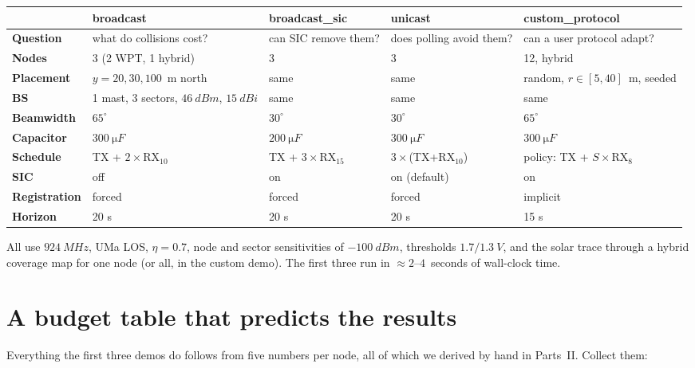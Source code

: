 \begin{center}
\footnotesize
\renewcommand{\arraystretch}{1.15}
\begin{tabularx}{\linewidth}{@{}>{\sffamily\bfseries}p{2.3cm}XXXX@{}}
\toprule
 & broadcast & broadcast\_sic & unicast & custom\_protocol\\
\midrule
Question & what do collisions cost? & can SIC remove them? & does polling avoid them? & can a user protocol adapt?\\
Nodes & 3 (2 WPT, 1 hybrid) & 3 & 3 & 12, hybrid\\
Placement & $y=20,30,100$~m north & same & same & random, $r\in[5,40]$~m, seeded\\
BS & 1 mast, 3 sectors, $\SI{46}{dBm}$, $\SI{15}{dBi}$ & same & same & same\\
Beamwidth & $65^\circ$ & $30^\circ$ & $30^\circ$ & $65^\circ$\\
Capacitor & $\SI{300}{\micro F}$ & $\SI{200}{\micro F}$ & $\SI{300}{\micro F}$ & $\SI{300}{\micro F}$\\
Schedule & TX + $2\times$RX$_{10}$ & TX + $3\times$RX$_{15}$ & $3\times$(TX+RX$_{10}$) & policy: TX + $S\times$RX$_8$\\
SIC & off & on & on (default) & on\\
Registration & forced & forced & forced & implicit\\
Horizon & 20 s & 20 s & 20 s & 15 s\\
\bottomrule
\end{tabularx}
\end{center}
All use $\SI{924}{MHz}$, UMa LOS, $\eta=0.7$, node and sector sensitivities of $\SI{-100}{dBm}$, thresholds $1.7/\SI{1.3}{V}$, and the solar trace through a hybrid coverage map for one node (or all, in the custom demo). The first three run in $\approx2$--$4$~seconds of wall-clock time.

\section{A budget table that predicts the results}
\label{sec:budgettable}

Everything the first three demos do follows from five numbers per node, all of which we derived by hand in Parts~II. Collect them:

